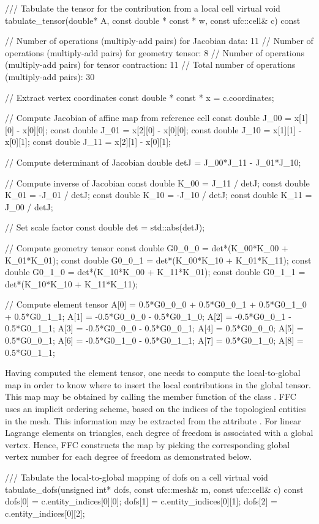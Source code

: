 \begin{c++}
/// Tabulate the tensor for the contribution from a local cell
virtual void tabulate_tensor(double* A,
                             const double * const * w,
                             const ufc::cell& c) const
{
  // Number of operations (multiply-add pairs) for Jacobian data:      11
  // Number of operations (multiply-add pairs) for geometry tensor:    8
  // Number of operations (multiply-add pairs) for tensor contraction: 11
  // Total number of operations (multiply-add pairs):                  30

  // Extract vertex coordinates
  const double * const * x = c.coordinates;

  // Compute Jacobian of affine map from reference cell
  const double J_00 = x[1][0] - x[0][0];
  const double J_01 = x[2][0] - x[0][0];
  const double J_10 = x[1][1] - x[0][1];
  const double J_11 = x[2][1] - x[0][1];

  // Compute determinant of Jacobian
  double detJ = J_00*J_11 - J_01*J_10;

  // Compute inverse of Jacobian
  const double K_00 =  J_11 / detJ;
  const double K_01 = -J_01 / detJ;
  const double K_10 = -J_10 / detJ;
  const double K_11 =  J_00 / detJ;

  // Set scale factor
  const double det = std::abs(detJ);

  // Compute geometry tensor
  const double G0_0_0 = det*(K_00*K_00 + K_01*K_01);
  const double G0_0_1 = det*(K_00*K_10 + K_01*K_11);
  const double G0_1_0 = det*(K_10*K_00 + K_11*K_01);
  const double G0_1_1 = det*(K_10*K_10 + K_11*K_11);

  // Compute element tensor
  A[0] = 0.5*G0_0_0 + 0.5*G0_0_1 + 0.5*G0_1_0 + 0.5*G0_1_1;
  A[1] = -0.5*G0_0_0 - 0.5*G0_1_0;
  A[2] = -0.5*G0_0_1 - 0.5*G0_1_1;
  A[3] = -0.5*G0_0_0 - 0.5*G0_0_1;
  A[4] = 0.5*G0_0_0;
  A[5] = 0.5*G0_0_1;
  A[6] = -0.5*G0_1_0 - 0.5*G0_1_1;
  A[7] = 0.5*G0_1_0;
  A[8] = 0.5*G0_1_1;
}
\end{c++}

Having computed the element tensor, one needs to compute the
local-to-global map in order to know where to insert the local
contributions in the global tensor. This map may be obtained by
calling the member function  of the class
. FFC uses an implicit ordering scheme, based on the
indices of the topological entities in the mesh. This information may
be extracted from the  attribute .  For
linear Lagrange elements on triangles, each degree of freedom is
associated with a global vertex. Hence, FFC constructs the map by
picking the corresponding global vertex number for each degree of
freedom as demonstrated below.
\begin{c++}
/// Tabulate the local-to-global mapping of dofs on a cell
virtual void tabulate_dofs(unsigned int* dofs,
                           const ufc::mesh& m,
                           const ufc::cell& c) const
{
  dofs[0] = c.entity_indices[0][0];
  dofs[1] = c.entity_indices[0][1];
  dofs[2] = c.entity_indices[0][2];
}
\end{c++}

